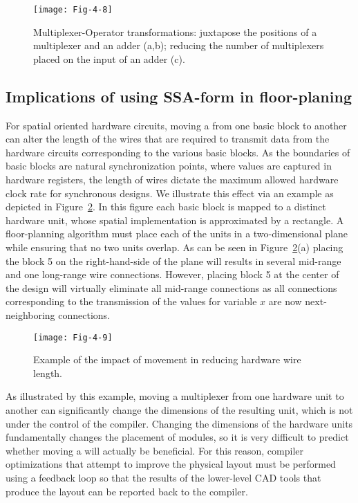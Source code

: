 \begin{figure}[thbp]
\centering
\texttt{[image: Fig-4-8]}
\caption{Multiplexer-Operator transformations: 
  juxtapose the positions of a multiplexer and an adder (a,b); 
  reducing the number of multiplexers placed on the input of an adder (c).}
\label{fig:Fig.4.8}
\end{figure}


\subsection{Implications of using SSA-form in floor-planing}
For spatial oriented hardware circuits, moving a \phifun from one basic block to another can alter the length of the wires that are required to transmit data from the hardware circuits corresponding to the various basic blocks. 
As the boundaries of basic blocks are natural synchronization points, where values are captured in hardware registers, the length of wires dictate the maximum allowed hardware clock rate for synchronous designs. 
We illustrate this effect via an example as depicted in Figure~\ref{fig:Fig.4.9}. 
In this figure each basic block is mapped to a distinct hardware unit, whose spatial implementation is approximated by a rectangle. 
A floor-planning algorithm must place each of the units in a two-dimensional plane while ensuring that no two units overlap. 
As can be seen in Figure~\ref{fig:Fig.4.9}(a) placing the block 5 on the right-hand-side of the plane will results in several mid-range and one long-range wire connections. 
However, placing block 5 at the center of the design will virtually eliminate all mid-range connections as all connections corresponding to the transmission of the values for variable $x$ are now next-neighboring connections.

\begin{figure}[thbp]
\centering
\texttt{[image: Fig-4-9]}
\caption{Example of the impact of \phifun movement in
reducing hardware wire length.}
\label{fig:Fig.4.9}
\end{figure}

As illustrated by this example, moving a multiplexer from one hardware unit to another can significantly change the dimensions of the resulting unit, which is not under the control of the compiler. 
Changing the dimensions of the hardware units fundamentally changes the placement of modules, so it is very difficult to predict whether moving a \phifun will actually be beneficial. 
For this reason, compiler optimizations that attempt to improve the physical layout must be performed using a feedback loop so that the results of the lower-level CAD tools that produce the layout can be reported back to the compiler.

